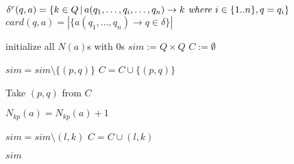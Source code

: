 
	 {
		 {
			$\delta^r(q,a) = \{k \in Q\,|\, a(q_1,\ldots, q_i, \ldots, q_n) \rightarrow k \emph{ where } i \in \{1..n\}, q = q_i \}$\;
			$card(q,a) = |\{a(q_1, \ldots, q_n) \rightarrow q \in \delta\}|$\;
		}
	}

	initialize all $N(a)$s with $0$s\;
	$sim := Q\times Q$\;
	$C := \emptyset$\;

	 {
		 {
			$sim = sim \setminus \{(p,q)\}$\;
			$C = C \cup \{(p,q)\}$\;
		}
	}
	
	{
		Take $(p,q)$ from $C$\;
		{
			{
				{
					$N_{kp}(a) = N_{kp}(a) + 1$\;
				}

				{
					{
						{
							$sim = sim \setminus {(l,k)}$\;
							$C = C \cup {(l,k)}$\;
						}
					}
				}
			}
		}

	}
	\Return $sim$\;
